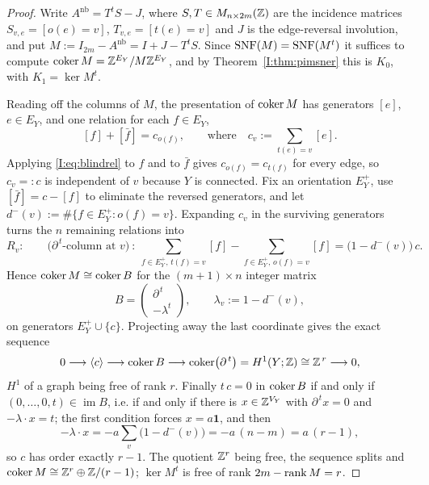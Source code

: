\begin{proof}
Write $A^{\mathrm{nb}}=T^{t}S-J$, where $S,T\in M_{n\times2m}(\mathbb{Z})$ are the incidence
matrices $S_{v,e}=[o(e)=v]$, $T_{v,e}=[t(e)=v]$ and $J$ is the edge-reversal involution,
and put $M:=I_{2m}-A^{\mathrm{nb}}=I+J-T^{t}S$. Since $\operatorname{SNF}(M)=\operatorname{SNF}(M^{t})$ it suffices
to compute $\operatorname{coker} M=\mathbb{Z}^{E_Y}/M\mathbb{Z}^{E_Y}$, and by Theorem~\ref{I:thm:pimsner} this is
$K_0$, with $K_1=\ker M^t$.

Reading off the columns of $M$, the presentation of $\operatorname{coker} M$ has generators $[e]$,
$e\in E_Y$, and one relation for each $f\in E_Y$,
\begin{equation}\label{I:eq:blindrel}
[f]+[\bar f]=c_{o(f)},\qquad\text{where}\quad c_v:=\sum_{t(e)=v}[e].
\end{equation}
Applying \eqref{I:eq:blindrel} to $f$ and to $\bar f$ gives $c_{o(f)}=c_{t(f)}$ for every
edge, so $c_v=:c$ is independent of $v$ because $Y$ is connected. Fix an orientation
$E_Y^+$, use $[\bar f]=c-[f]$ to eliminate the reversed generators, and let
$d^-(v):=\#\{f\in E_Y^+:o(f)=v\}$. Expanding $c_v$ in the surviving generators turns the
$n$ remaining relations into
\[
R_v:\qquad \bigl(\partial^{\,t}\text{-column at }v\bigr)\ :\
\sum_{f\in E_Y^+,\,t(f)=v}[f]-\sum_{f\in E_Y^+,\,o(f)=v}[f]
=\bigl(1-d^-(v)\bigr)\,c .
\]
Hence $\operatorname{coker} M\cong\operatorname{coker} B$ for the $(m+1)\times n$ integer matrix
\[
B=\begin{pmatrix}\partial^{\,t}\\ -\lambda^{t}\end{pmatrix},
\qquad \lambda_v:=1-d^-(v),
\]
on generators $E_Y^+\cup\{c\}$. Projecting away the last coordinate gives the exact
sequence
\[
0\longrightarrow\langle c\rangle\longrightarrow\operatorname{coker} B
\longrightarrow\operatorname{coker}\bigl(\partial^{\,t}\bigr)=H^1(Y;\mathbb{Z})\cong\mathbb{Z}^{\,r}
\longrightarrow0 ,
\]
$H^1$ of a graph being free of rank $r$. Finally $t\,c=0$ in $\operatorname{coker} B$ if and only if
$(0,\dots,0,t)\in\operatorname{im}B$, i.e. if and only if there is $x\in\mathbb{Z}^{V_Y}$ with
$\partial^{\,t}x=0$ and $-\lambda\cdot x=t$; the first condition forces $x=a\mathbf1$,
and then
\[
-\lambda\cdot x=-a\sum_{v}\bigl(1-d^-(v)\bigr)=-a\,(n-m)=a\,(r-1),
\]
so $c$ has order exactly $r-1$. The quotient $\mathbb{Z}^r$ being free, the sequence splits and
$\operatorname{coker} M\cong\mathbb{Z}^{r}\oplus\mathbb{Z}/(r-1)$; $\ker M^t$ is free of rank $2m-\operatorname{rank} M=r$.
\end{proof}

